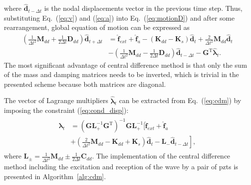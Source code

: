 where \(\widehat{\textbf{d}}_{t-\Delta t}\) is the nodal displacements vector in the previous time step.
Thus, substituting Eq.~(\ref{eq:v}) and (\ref{eq:a}) into Eq.~(\ref{eq:motionD}) and after some rearrangement, global equation of motion can be expressed as
\begin{equation}
	\begin{split}
		\left(\frac{1}{\Delta t^2}\textbf{M}_{dd}+\frac{1}{2\Delta t}\textbf{D}_{dd} \right)\widehat{\textbf{d}}_{t+\Delta t} & = \widehat{\textbf{f}}_{ext} + \widehat{\textbf{f}}_{a} - \left( \textbf{K}_{dd}-\textbf{K}_s\right)\widehat{\textbf{d}}_t
		+ \frac{2}{\Delta t^2}\textbf{M}_{dd}\widehat{\textbf{d}}_t\\
		&-\left(\frac{1}{\Delta t^2}\textbf{M}_{dd}-\frac{1}{2\Delta t}\textbf{D}_{dd}\right)\widehat{\textbf{d}}_{t-\Delta t}-\textbf{G}^{\mathrm{T}}\widehat{\boldsymbol{\lambda}}_t.
	\end{split}
	\label{eq:cdm}
\end{equation}
The most significant advantage of central difference method is that only the sum of the mass and damping matrices needs to be inverted, which is trivial in the presented scheme because both matrices are diagonal.

The vector of Lagrange multipliers \(\widehat{\boldsymbol{\lambda}}_t\) can be extracted from Eq.~(\ref{eq:cdm}) by imposing the constraint (\ref{eq:cond_disp}):
\begin{eqnarray}
	\begin{split}
		\widehat{\boldsymbol{\lambda}}_t & = {\left(\textbf{G}\textbf{L}_+^{-1}\textbf{G}^{\mathrm{T}} 	\right)}^{-1}\textbf{G}\textbf{L}_+^{-1} \Bigg[ \widehat{\textbf{f}}_{ext} + \widehat{\textbf{f}}_{a}\\
		& + \left.\left(\frac{2}{\Delta t^2}\textbf{M}_{dd}-\textbf{K}_{dd}+\textbf{K}_s\right)\widehat{\textbf{d}}_t -\textbf{L}_-\widehat{\textbf{d}}_{t-\Delta t} \right],
	\end{split}
	\label{eq:lambda}
\end{eqnarray}
where \(\textbf{L}_{\pm}=\frac{1}{\Delta t^2}\textbf{M}_{dd}\pm\frac{1}{2\Delta t}\textbf{C}_{dd}\).
The implementation of the central difference method including the excitation and reception of the wave by a pair of \acp{pzt} is presented in Algorithm~\ref{alg:cdm}.

